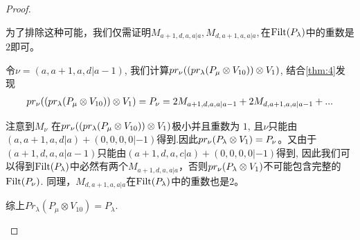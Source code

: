 \begin{proof}
\begin{enumerate}
\begin{enumerate}
\begin{enumerate}
为了排除这种可能，我们仅需证明$M_{a+1,d,a,a|a},M_{d,a+1,a,a|a},$在$\operatorname{Filt}(P_{\lambda})$中的重数是$2$即可。

令$\nu = (a,a+1,a,d|a-1)$, 我们计算$pr_\nu ( ( pr_\lambda(P_\mu \otimes V_{10}) ) \otimes V_1 )$, 结合\cref{thm:4}发现
\begin{equation}\notag
  \begin{aligned}
  pr_\nu ( ( pr_\lambda(P_\mu \otimes V_{10}) ) \otimes V_1 ) =
  P_\nu = 2M_{a+1,d,a,a|a-1} +2 M_{d,a+1,a,a|a-1} + ...
  \end{aligned}
\end{equation}

注意到$M_\nu$ 在$pr_\nu ( ( pr_\lambda(P_\mu \otimes V_{10}) ) \otimes V_1 )$极小并且重数为 $1$, 且$\nu$只能由$ (a,a+1,a,d|a) + (0,0,0,0|-1)$得到.因此$pr_\nu(P_\lambda \otimes V_1) = P_\nu$。又由于$(a+1,d,a,a|a-1)$只能由$(a+1,d,a,c|a) + (0,0,0,0|-1)$得到, 因此我们可以得到$\operatorname{Filt}(P_{\lambda})$中必然有两个$M_{a+1,d,a,a|a}$，否则$pr_\nu(P_\lambda \otimes V_1)$不可能包含完整的$\operatorname{Filt}(P_\nu)$. 同理，$M_{d,a+1,a,a|a}$在$\operatorname{Filt}(P_{\lambda})$中的重数也是2。

综上$Pr_{\lambda}(P_\mu \otimes V_{10}) = P_\lambda  $.


\end{enumerate}
\end{enumerate}
\end{enumerate}
\end{proof}
